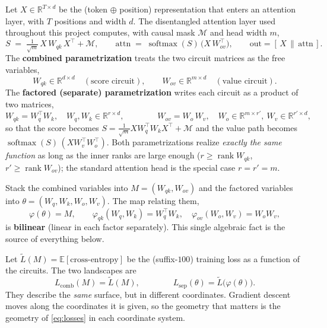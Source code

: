 \documentclass[11pt]{article}
\theoremstyle{remark}
\newcommand{\R}{\mathbb{R}}
\newcommand{\E}{\mathbb{E}}
\newcommand{\Wqk}{W_{qk}}
\newcommand{\Wov}{W_{ov}}
\newcommand{\Wq}{W_{q}}
\newcommand{\Wk}{W_{k}}
\newcommand{\Wo}{W_{o}}
\newcommand{\Wv}{W_{v}}
\newcommand{\softmax}{\operatorname{softmax}}
\DeclareMathOperator{\rank}{rank}
\begin{document}
Let $X\in\R^{T\times d}$ be the (token $\oplus$ position) representation that
enters an attention layer, with $T$ positions and width $d$. The disentangled
attention layer used throughout this project computes, with causal mask
$\mathcal M$ and head width $m$,
\begin{equation}\label{eq:layer}
S \;=\; \tfrac{1}{\sqrt m}\, X\,\Wqk\,X^{\!\top} + \mathcal M,
\qquad
\text{attn} \;=\; \softmax(S)\,\bigl(X\,\Wov^{\!\top}\bigr),
\qquad
\text{out} = [\,X \,\|\, \text{attn}\,].
\end{equation}
The \textbf{combined parametrization} treats the two circuit matrices as the
free variables,
\[
\boxed{\;\Wqk\in\R^{d\times d}\quad(\text{score circuit}),\qquad
        \Wov\in\R^{m\times d}\quad(\text{value circuit}).\;}
\]
The \textbf{factored (separate) parametrization} writes each circuit as a product
of two matrices,
\begin{equation}\label{eq:factor}
\Wqk=\Wq^{\!\top}\Wk,\quad \Wq,\Wk\in\R^{r\times d},
\qquad\qquad
\Wov=\Wo\,\Wv,\quad \Wo\in\R^{m\times r'},\ \Wv\in\R^{r'\times d},
\end{equation}
so that the score becomes $S=\tfrac{1}{\sqrt m}X\Wq^{\!\top}\Wk X^{\!\top}+\mathcal M$
and the value path becomes $\softmax(S)\,(X\Wv^{\!\top}\Wo^{\!\top})$. Both
parametrizations realize \emph{exactly the same function} as long as the inner
ranks are large enough ($r\ge\rank\Wqk$, $r'\ge\rank\Wov$); the standard
attention head is the special case $r=r'=m$.

Stack the combined variables into $M=(\Wqk,\Wov)$ and the factored variables into
$\theta=(\Wq,\Wk,\Wo,\Wv)$. The map relating them,
\begin{equation}\label{eq:phi}
\varphi(\theta)=M,\qquad
\varphi_{qk}(\Wq,\Wk)=\Wq^{\!\top}\Wk,\quad
\varphi_{ov}(\Wo,\Wv)=\Wo\Wv,
\end{equation}
is \textbf{bilinear} (linear in each factor separately). This single algebraic
fact is the source of everything below.

Let $\widetilde L(M)=\E[\text{cross-entropy}]$ be the (suffix-$100$) training loss
as a function of the circuits. The two landscapes are
\begin{equation}\label{eq:losses}
L_{\mathrm{comb}}(M)=\widetilde L(M),
\qquad\qquad
L_{\mathrm{sep}}(\theta)=\widetilde L\bigl(\varphi(\theta)\bigr).
\end{equation}
They describe the \emph{same} surface, but in different coordinates. Gradient
descent moves along the coordinates it is given, so the geometry that matters is
the geometry of \eqref{eq:losses} in each coordinate system.
\end{document}
